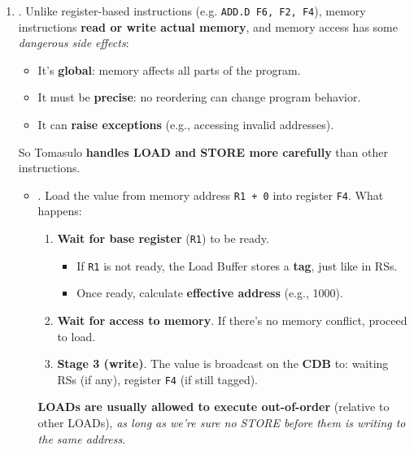 \begin{enumerate}
    
    \item {}. Unlike register-based instructions (e.g. \texttt{ADD.D F6, F2, F4}), memory instructions \textbf{read or write actual memory}, and memory access has some \emph{dangerous side effects}:
    \begin{itemize}
        \item It's \textbf{global}: memory affects all parts of the program.
        \item It must be \textbf{precise}: no reordering can change program behavior.
        \item It can \textbf{raise exceptions} (e.g., accessing invalid addresses).
    \end{itemize}
    So Tomasulo \textbf{handles LOAD and STORE more carefully} than other instructions.
    \begin{itemize}
        \item {}. Load the value from memory address \texttt{R1 + 0} into register \texttt{F4}. What happens:
        \begin{enumerate}
            \item \textbf{Wait for base register} (\texttt{R1}) to be ready.
            \begin{itemize}
                \item If \texttt{R1} is not ready, the Load Buffer stores a \textbf{tag}, just like in RSs.
                \item Once ready, calculate \textbf{effective address} (e.g., 1000).
            \end{itemize}

            \item \textbf{Wait for access to memory}. If there's no memory conflict, proceed to load.
            
            \item \textbf{Stage 3 (write)}. The value is broadcast on the \textbf{CDB} to: waiting RSs (if any), register \texttt{F4} (if still tagged).
        \end{enumerate}
        \textbf{LOADs are usually allowed to execute out-of-order} (relative to other LOADs), \emph{as long as we're sure no STORE before them is writing to the same address}.


\end{itemize}
\end{enumerate}
